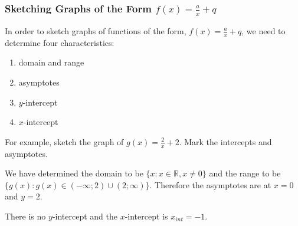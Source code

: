             \subsubsection{ Sketching Graphs of the Form $f\left(x\right)=\frac{a}{x}+q$}
            \nopagebreak
          \label{m39341*id248894}In order to sketch graphs of functions of the form, $f\left(x\right)=\frac{a}{x}+q$, we need to determine four characteristics:\par 
          \label{m39341*id248931}\begin{enumerate}[noitemsep, label=\textbf{\arabic*}. ] 
            \label{m39341*uid158}\item domain and range
\label{m39341*uid159}\item asymptotes
\label{m39341*uid160}\item $y$-intercept
\label{m39341*uid161}\item $x$-intercept
\end{enumerate}
          \label{m39341*id248998}For example, sketch the graph of $g\left(x\right)=\frac{2}{x}+2$. Mark the intercepts and asymptotes.\par 
          \label{m39341*id249035}We have determined the domain to be $\{x:x\in \mathbb{R},x\ne 0\}$ and the range to be $\{g\left(x\right):g\left(x\right)\in \left(-\infty ;2\right)\cup \left(2;\infty \right)\}$. Therefore the asymptotes are at $x=0$ and $y=2$.\par 
          \label{m39341*id249164}There is no $y$-intercept and the $x$-intercept is ${x}_{int}=-1$.\par 
    \setcounter{subfigure}{0}
